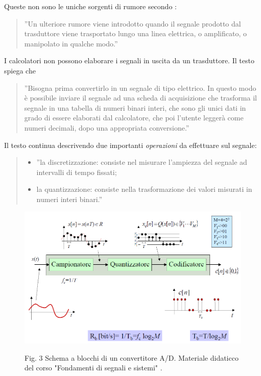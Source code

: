 \documentclass[a4paper]{report} %
\begin{document}
Queste non sono le uniche sorgenti di rumore secondo \cite{art:rif.2}:
\begin{quote}
	''Un ulteriore rumore viene introdotto quando il segnale prodotto dal trasduttore viene trasportato lungo una linea elettrica, o amplificato, o manipolato in qualche modo.'' 
\end{quote}
I calcolatori non possono elaborare i segnali in uscita da un trasduttore. Il testo \cite{art:rif.2} spiega che 
\begin{quote}
	''Bisogna prima convertirlo in un segnale di tipo elettrico. In questo modo è possibile inviare il segnale ad una scheda di acquisizione che trasforma il segnale in una tabella di numeri binari interi, che sono gli unici dati in grado di essere elaborati dal calcolatore, che poi l'utente leggerà come numeri decimali, dopo una appropriata conversione.''
\end{quote}
Il testo continua descrivendo due importanti \textit{operazioni} da effettuare sul segnale:
\begin{quote}	
	\begin{itemize}
		\item ''la discretizzazione: consiste nel misurare l'ampiezza del segnale ad intervalli di tempo fissati;
		\item la quantizzazione: consiste nella trasformazione dei valori misurati in numeri interi binari.'' 
	\end{itemize}
\end{quote}
 
\begin{figure}
	\centering
	\includegraphics[scale=.4]{Immagini/schemaAD.png}
	
	Fig. 3 Schema a blocchi di un convertitore A/D.
	Materiale didaticco del corso "Fondamenti di segnali e sistemi" \cite{art:rif.7}.
\end{figure}
\end{document}
